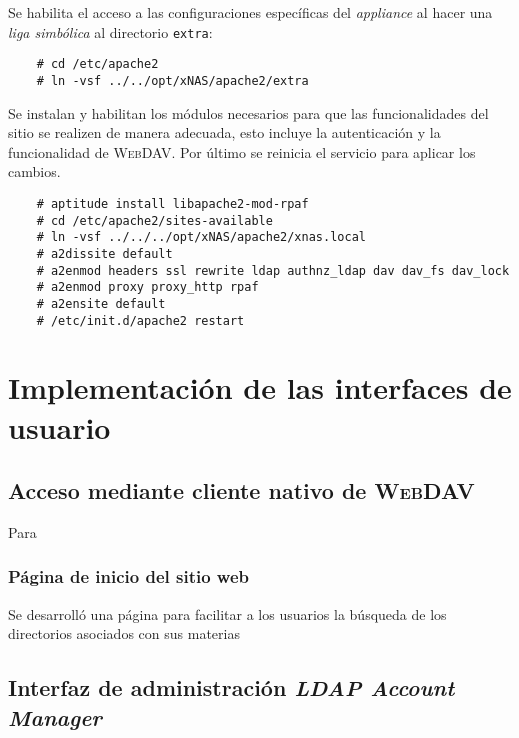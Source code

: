 Se habilita el acceso a las configuraciones espec\'{i}ficas del \textit{appliance} al hacer una \textit{liga simb\'{o}lica} al directorio \texttt{extra}:

{
\scriptsize
\linespread{1}
\begin{verbatim}
    # cd /etc/apache2
    # ln -vsf ../../opt/xNAS/apache2/extra
\end{verbatim}
}

Se instalan y habilitan los m\'{odulos} necesarios para que las funcionalidades del sitio se realizen de manera adecuada, esto incluye la autenticaci\'{o}n y la funcionalidad de \textsc{WebDAV}. Por \'{u}ltimo se reinicia el servicio para aplicar los cambios.

{
\scriptsize
\linespread{1}
\begin{verbatim}
    # aptitude install libapache2-mod-rpaf
    # cd /etc/apache2/sites-available
    # ln -vsf ../../../opt/xNAS/apache2/xnas.local
    # a2dissite default
    # a2enmod headers ssl rewrite ldap authnz_ldap dav dav_fs dav_lock
    # a2enmod proxy proxy_http rpaf
    # a2ensite default
    # /etc/init.d/apache2 restart
\end{verbatim}
}


    \section {Implementaci\'{o}n de las interfaces de usuario}

      \subsection {Acceso mediante cliente nativo de \textsc{WebDAV}}

Para 

        \subsubsection{P\'{a}gina de inicio del sitio web}

Se desarroll\'{o} una p\'{a}gina para facilitar a los usuarios la b\'{u}squeda de los directorios asociados con sus materias

      \subsection {Interfaz de administraci\'{o}n \textit{LDAP Account Manager}}

